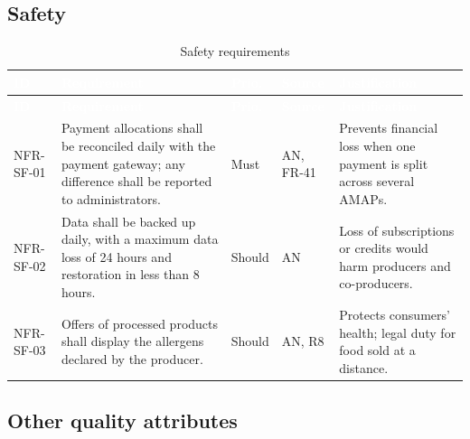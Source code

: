 \documentclass[11pt,a4paper]{article}
\begin{document}
\subsection{Safety}

{\footnotesize
\begin{longtable}{>{\raggedright\arraybackslash\hspace{0pt}}p{}>{\raggedright\arraybackslash\hspace{0pt}}p{}>{\raggedright\arraybackslash\hspace{0pt}}p{}>{\raggedright\arraybackslash\hspace{0pt}}p{}>{\raggedright\arraybackslash\hspace{0pt}}p{}}
\caption{Safety requirements}\\
\rowcolor{hdr}\textcolor{white}{\textbf{ID}} & \textcolor{white}{\textbf{Requirement}} & \textcolor{white}{\textbf{Prio.}} & \textcolor{white}{\textbf{Source}} & \textcolor{white}{\textbf{Justification}} \\ \endfirsthead
\rowcolor{hdr}\textcolor{white}{\textbf{ID}} & \textcolor{white}{\textbf{Requirement}} & \textcolor{white}{\textbf{Prio.}} & \textcolor{white}{\textbf{Source}} & \textcolor{white}{\textbf{Justification}} \\ \endhead
NFR-SF-01 & Payment allocations shall be reconciled daily with the payment gateway; any difference shall be reported to administrators. & Must & AN, FR-41 & Prevents financial loss when one payment is split across several AMAPs. \\ \hline
NFR-SF-02 & Data shall be backed up daily, with a maximum data loss of 24 hours and restoration in less than 8 hours. & Should & AN & Loss of subscriptions or credits would harm producers and co-producers. \\ \hline
NFR-SF-03 & Offers of processed products shall display the allergens declared by the producer. & Should & AN, R8 & Protects consumers' health; legal duty for food sold at a distance. \\ \hline
\end{longtable}}

\subsection{Other quality attributes}
\end{document}
